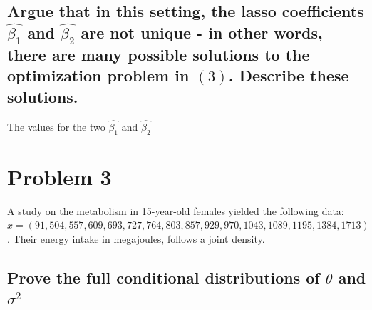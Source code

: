\documentclass[20pt]{article} %
\begin{document}
\subsection{Argue that in this setting, the lasso coefficients $\hat{\beta_1}$ and $\hat{\beta_2}$ are not unique - in other words, there are many possible solutions to the optimization problem in $(3)$. Describe these solutions.}
The values for the two $\hat{\beta_1}$ and $\hat{\beta_2}$

\section{Problem 3}
A study on the metabolism in 15-year-old females yielded the following data:
$x = (91, 504, 557, 609, 693, 727, 764, 803, 857, 929, 970, 1043, 1089, 1195, 1384, 1713)$.  Their energy intake in megajoules, follows a joint density.
\subsection{Prove the full conditional distributions of $\theta$ and $\sigma^{2}$}
\end{document}
